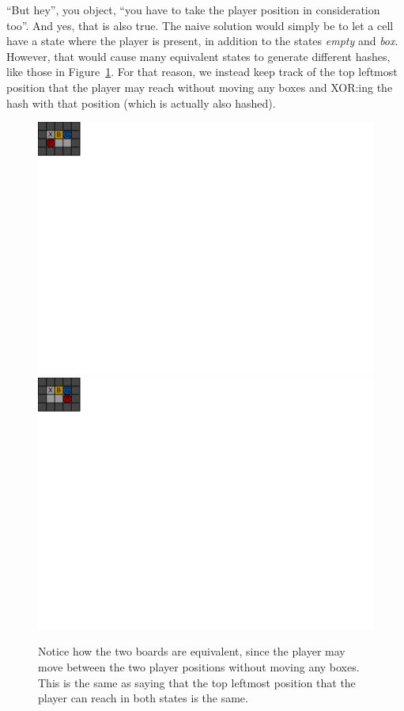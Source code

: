 \documentclass[a4paper,12pt]{article}
\renewcommand{\*}[0]{\cdot}
\begin{document}
``But hey'', you object, ``you have to take the player position in
consideration too''. And yes, that is also true. The naive solution would
simply be to let a cell have a state where the player is present, in addition
to the states \emph{empty} and \emph{box}. However, that would cause many
equivalent states to generate different hashes, like those in
Figure~\ref{fig:equalStatesDifferentHash}. For that reason, we instead keep
track of the top leftmost position that the player may reach without moving any
boxes and XOR:ing the hash with that position (which is actually also hashed).

\begin{figure}[h!]
    \begin{center}
        \includegraphics{figures/equalState1}
        \includegraphics{figures/equalState2}
    \end{center}
    \caption{Notice how the two boards are equivalent, since the player may move
    between the two player positions without moving any boxes. This is the same
    as saying that the top leftmost position that the player can reach in both
    states is the same.}
    \label{fig:equalStatesDifferentHash}
\end{figure}
\end{document}
